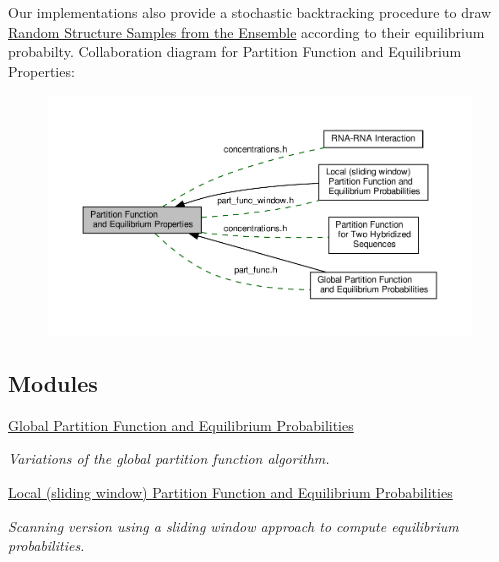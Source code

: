Our implementations also provide a stochastic backtracking procedure to draw \hyperlink{group__subopt__stochbt}{Random Structure Samples from the Ensemble} according to their equilibrium probabilty. Collaboration diagram for Partition Function and Equilibrium Properties\+:
\nopagebreak
\begin{figure}[H]
\begin{center}
\leavevmode
\includegraphics[width=350pt]{group__pf__fold}
\end{center}
\end{figure}
\subsection*{Modules}
\begin{DoxyCompactItemize}
\item 
\hyperlink{group__part__func__global}{Global Partition Function and Equilibrium Probabilities}
\begin{DoxyCompactList}\small\item\em Variations of the global partition function algorithm. \end{DoxyCompactList}\item 
\hyperlink{group__part__func__window}{Local (sliding window) Partition Function and Equilibrium Probabilities}
\begin{DoxyCompactList}\small\item\em Scanning version using a sliding window approach to compute equilibrium probabilities. \end{DoxyCompactList}\end{DoxyCompactItemize}

